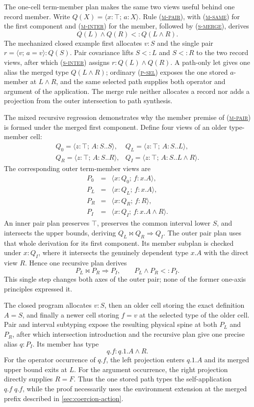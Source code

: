 \documentclass[acmsmall,screen,nonacm]{acmart}
\newcommand{\ruleref}[1]{%
  \textsc{(\hyperref[rule:#1]{#1})}}
\newcommand{\pairty}[4]{\langle #1\!:\!#2;\,#3\!:\!#4\rangle}
\newcommand{\interty}[2]{#1\mathbin{\wedge}#2}
\newcommand{\mergeop}{\mathbin{\bowtie}}
\newcommand{\pairval}[3]{\langle #1;\,#2=#3\rangle}
\begin{document}
The one-cell term-member plan makes the same two views useful behind one
record member. Write \(Q(X)=\pairty{x}{\top}{a}{X}\). Rule
\ruleref{m-pair}, with \ruleref{m-same} for the first component and
\ruleref{m-inter} for the member, followed by \ruleref{s-merge}, derives
\[
  \interty{Q(L)}{Q(R)}<:Q(\interty{L}{R}).
\]
The mechanized closed example first allocates \(v:S\) and the single pair
\(r=\pairval{v}{a}{v}:Q(S)\). Pair covariance lifts \(S<:L\) and
\(S<:R\) to the two record views, after which \ruleref{s-inter} assigns
\(r:\interty{Q(L)}{Q(R)}\). A path-only let gives one alias the merged type
\(Q(\interty{L}{R})\); ordinary \ruleref{p-sel} exposes the one stored
\(a\)-member at \(\interty{L}{R}\), and the same selected path supplies both
operator and argument of the application. The merge rule neither allocates a
record nor adds a projection from the outer intersection to path synthesis.

The mixed recursive regression demonstrates why the member premise of
\ruleref{m-pair} is formed under the merged first component. Define four
views of an older type-member cell:
\[
\begin{array}{ll}
 Q_0=\pairty{z}{\top}{A}{S..S},
 &Q_L=\pairty{z}{\top}{A}{S..L},\\[2pt]
 Q_R=\pairty{z}{\top}{A}{S..R},
 &Q_I=\pairty{z}{\top}{A}{S..\interty{L}{R}}.
\end{array}
\]
The corresponding outer term-member views are
\[
\begin{array}{rcl}
 P_0&=&\pairty{x}{Q_0}{f}{x.A},\\
 P_L&=&\pairty{x}{Q_L}{f}{x.A},\\
 P_R&=&\pairty{x}{Q_R}{f}{R},\\
 P_I&=&\pairty{x}{Q_I}{f}{\interty{x.A}{R}}.
\end{array}
\]
An inner pair plan preserves \(\top\), preserves the common interval lower
\(S\), and intersects the upper bounds, deriving
\(Q_L\mergeop Q_R\Longrightarrow Q_I\). The outer pair plan uses that whole
derivation for its first component. Its member subplan is checked under
\(x:Q_I\), where it intersects the genuinely dependent type \(x.A\) with
the direct view \(R\). Hence one recursive plan derives
\[
  P_L\mergeop P_R\Longrightarrow P_I,
  \qquad
  \interty{P_L}{P_R}<:P_I.
\]
This single step changes both axes of the outer pair; none of the former
one-axis principles expressed it.

The closed program allocates \(v:S\), then an older cell storing the exact
definition \(A=S\), and finally a newer cell storing \(f=v\) at the selected
type of the older cell. Pair and interval subtyping expose the resulting
physical spine at both \(P_L\) and \(P_R\), after which intersection
introduction and the recursive plan give one precise alias \(q:P_I\). Its
member has type
\[
  q.f:\interty{q.1.A}{R}.
\]
For the operator occurrence of \(q.f\), the left projection enters \(q.1.A\)
and its merged upper bound exits at \(L\). For the argument occurrence, the
right projection directly supplies \(R=F\). Thus the one stored path types
the self-application \(q.f\;q.f\), while the proof necessarily uses the
environment extension at the merged prefix described in
\cref{sec:coercion-action}.
\end{document}
